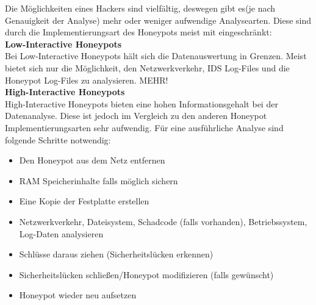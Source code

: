 \noindent Die Möglichkeiten eines Hackers sind vielfältig, deswegen gibt es(je nach Genauigkeit der Analyse) mehr oder weniger aufwendige Analysearten. Diese sind durch die Implementierungsart des Honeypots meist mit eingeschränkt:\\
\newpage
\noindent\textbf{Low-Interactive Honeypots}\\
Bei Low-Interactive Honeypots hält sich die Datenauswertung in Grenzen. Meist bietet sich nur die Möglichkeit, den Netzwerkverkehr, IDS Log-Files und die Honeypot Log-Files zu analysieren. MEHR!\\

\noindent\textbf{High-Interactive Honeypots}\\
\noindent High-Interactive Honeypots bieten eine hohen Informationsgehalt bei der Datenanalyse. Diese ist jedoch im Vergleich zu den anderen Honeypot Implementierungsarten sehr aufwendig. Für eine ausführliche Analyse sind folgende Schritte notwendig\cite{grimes.2003a}:

\begin{itemize}
\item Den Honeypot aus dem Netz entfernen
\item RAM Speicherinhalte falls möglich sichern
\item Eine Kopie der Festplatte erstellen
\item Netzwerkverkehr, Dateisystem, Schadcode (falls vorhanden), Betriebssystem, Log-Daten analysieren
\item Schlüsse daraus ziehen (Sicherheitslücken erkennen)
\item Sicherheitslücken schließen/Honeypot modifizieren (falls gewünscht)
\item Honeypot wieder neu aufsetzen
\end{itemize}